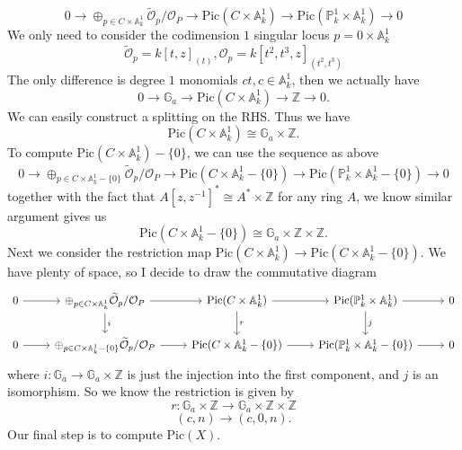 \documentclass[../main.tex]{subfiles}
\begin{document}
\begin{example}
$$0\rightarrow \oplus_{p\in C\times \mathbb{A}_{k}^{1}}\widetilde{\mathcal{O}}_{p}/\mathcal{O}_{P}\rightarrow \mathrm{Pic}(C\times \mathbb{A}_{k}^{1})\rightarrow \mathrm{Pic}(\mathbb{P}_{k}^{1}\times \mathbb{A}_{k}^{1})\rightarrow 0$$
We only need to consider the codimension $1$ singular locus $p=0\times \mathbb{A}_{k}^{1}$  
$$\widetilde{\mathcal{O}}_{p}=k[t,z]_{(t)}, \mathcal{O}_{p}=k[t^{2}, t^{3},z]_{(t^{2},t^{3})}$$
The only difference is degree $1$ monomials $ct, c\in\mathbb{A}_{k}^{1}$, then we actually have 
$$0\rightarrow \mathbb{G}_{a}\rightarrow \mathrm{Pic}(C\times \mathbb{A}_{k}^{1})\rightarrow \mathbb{Z}\rightarrow 0.$$ 
We can easily construct a splitting on the RHS. Thus we have 
$$\mathrm{Pic}(C\times \mathbb{A}_{k}^{1})\cong \mathbb{G}_{a}\times \mathbb{Z}.$$ To compute $\mathrm{Pic}(C\times \mathbb{A}_{k}^{1})-\{0\}$, we can use the sequence as above 
$$0\rightarrow \oplus_{p\in C\times \mathbb{A}_{k}^{1}-\{0\}}\widetilde{\mathcal{O}}_{p}/\mathcal{O}_{P}\rightarrow \mathrm{Pic}(C\times \mathbb{A}_{k}^{1}-\{0\})\rightarrow \mathrm{Pic}(\mathbb{P}_{k}^{1}\times \mathbb{A}_{k}^{1}-\{0\})\rightarrow 0$$
together with the fact that $A[z,z^{-1}]^{*}\cong A^{*}\times \mathbb{Z}$ for any ring $A$, we know similar argument gives us 
$$\mathrm{Pic}(C\times \mathbb{A}_{k}^{1}-\{0\})\cong \mathbb{G}_{a}\times \mathbb{Z}\times \mathbb{Z}.$$
Next we consider the restriction map $\mathrm{Pic}(C\times \mathbb{A}_{k}^{1})\rightarrow \mathrm{Pic}(C\times \mathbb{A}_{k}^{1}-\{0\}).$ We have plenty of space, so I decide to draw the commutative diagram 
$$\begin{tikzcd}
0 \arrow{r} & \oplus_{p\in C\times \mathbb{A}_{k}^{1}}\widetilde{\mathcal{O}}_{p}/\mathcal{O}_{P}\arrow{r}\arrow{d}{i}& \mathrm{Pic}(C\times \mathbb{A}_{k}^{1})\arrow{r}\arrow{d}{r} & \mathrm{Pic}(\mathbb{P}_{k}^{1}\times \mathbb{A}_{k}^{1})\arrow{r}\arrow{d}{j} & 0\\
0 \arrow{r} & \oplus_{p\in C\times \mathbb{A}_{k}^{1}-\{0\}}\widetilde{\mathcal{O}}_{p}/\mathcal{O}_{P}\arrow{r}& \mathrm{Pic}(C\times \mathbb{A}_{k}^{1}-\{0\})\arrow{r} & \mathrm{Pic}(\mathbb{P}_{k}^{1}\times \mathbb{A}_{k}^{1}-\{0\})\arrow{r} & 0
\end{tikzcd}$$
where $i: \mathbb{G}_{a}\rightarrow \mathbb{G}_{a}\times \mathbb{Z}$ is just the injection into the first component, and $j$ is an isomorphism. So we know the restriction is given by 
$$r:\mathbb{G}_{a}\times \mathbb{Z}\rightarrow \mathbb{G}_{a}\times \mathbb{Z}\times \mathbb{Z}$$
$$(c,n)\rightarrow (c,0,n).$$
Our final step is to compute $\mathrm{Pic}(X)$. 
\end{example}
\end{document}

